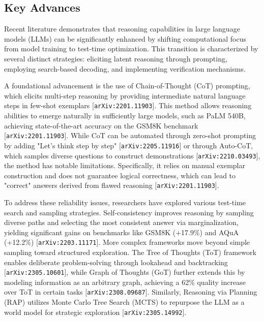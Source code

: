 \documentclass[11pt]{article}
\begin{document}
\subsection{Key Advances}

Recent literature demonstrates that reasoning capabilities in large language models (LLMs) can be significantly enhanced by shifting computational focus from model training to test-time optimization. This transition is characterized by several distinct strategies: eliciting latent reasoning through prompting, employing search-based decoding, and implementing verification mechanisms.

A foundational advancement is the use of Chain-of-Thought (CoT) prompting, which elicits multi-step reasoning by providing intermediate natural language steps in few-shot exemplars [\texttt{arXiv:2201.11903}]. This method allows reasoning abilities to emerge naturally in sufficiently large models, such as PaLM 540B, achieving state-of-the-art accuracy on the GSM8K benchmark [\texttt{arXiv:2201.11903}]. While CoT can be automated through zero-shot prompting by adding "Let's think step by step" [\texttt{arXiv:2205.11916}] or through Auto-CoT, which samples diverse questions to construct demonstrations [\texttt{arXiv:2210.03493}], the method has notable limitations. Specifically, it relies on manual exemplar construction and does not guarantee logical correctness, which can lead to "correct" answers derived from flawed reasoning [\texttt{arXiv:2201.11903}].

To address these reliability issues, researchers have explored various test-time search and sampling strategies. Self-consistency improves reasoning by sampling diverse paths and selecting the most consistent answer via marginalization, yielding significant gains on benchmarks like GSM8K (+17.9\%) and AQuA (+12.2\%) [\texttt{arXiv:2203.11171}]. More complex frameworks move beyond simple sampling toward structured exploration. The Tree of Thoughts (ToT) framework enables deliberate problem-solving through lookahead and backtracking [\texttt{arXiv:2305.10601}], while Graph of Thoughts (GoT) further extends this by modeling information as an arbitrary graph, achieving a 62\% quality increase over ToT in certain tasks [\texttt{arXiv:2308.09687}]. Similarly, Reasoning via Planning (RAP) utilizes Monte Carlo Tree Search (MCTS) to repurpose the LLM as a world model for strategic exploration [\texttt{arXiv:2305.14992}].
\end{document}
